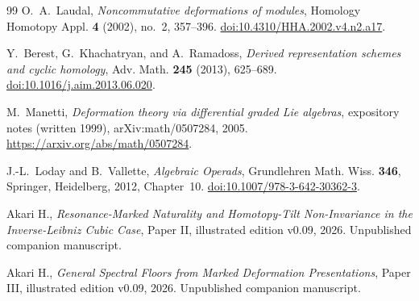 \documentclass[11pt]{amsart}
\begin{document}
\begin{thebibliography}{99}
O.~A.~Laudal,
\emph{Noncommutative deformations of modules},
Homology Homotopy Appl. \textbf{4} (2002), no.~2, 357--396.
\href{https://doi.org/10.4310/HHA.2002.v4.n2.a17}{doi:10.4310/HHA.2002.v4.n2.a17}.

Y.~Berest, G.~Khachatryan, and A.~Ramadoss,
\emph{Derived representation schemes and cyclic homology},
Adv. Math. \textbf{245} (2013), 625--689.
\href{https://doi.org/10.1016/j.aim.2013.06.020}{doi:10.1016/j.aim.2013.06.020}.


M.~Manetti,
\emph{Deformation theory via differential graded Lie algebras},
expository notes (written 1999), arXiv:math/0507284, 2005.
\url{https://arxiv.org/abs/math/0507284}.

J.-L.~Loday and B.~Vallette,
\emph{Algebraic Operads}, Grundlehren Math. Wiss. \textbf{346},
Springer, Heidelberg, 2012, Chapter~10.
\href{https://doi.org/10.1007/978-3-642-30362-3}{doi:10.1007/978-3-642-30362-3}.

Akari H.,
\emph{Resonance-Marked Naturality and Homotopy-Tilt Non-Invariance in the Inverse-Leibniz Cubic Case},
Paper II, illustrated edition v0.09, 2026. Unpublished companion manuscript.

Akari H.,
\emph{General Spectral Floors from Marked Deformation Presentations},
Paper III, illustrated edition v0.09, 2026. Unpublished companion manuscript.
\end{thebibliography}
\end{document}
